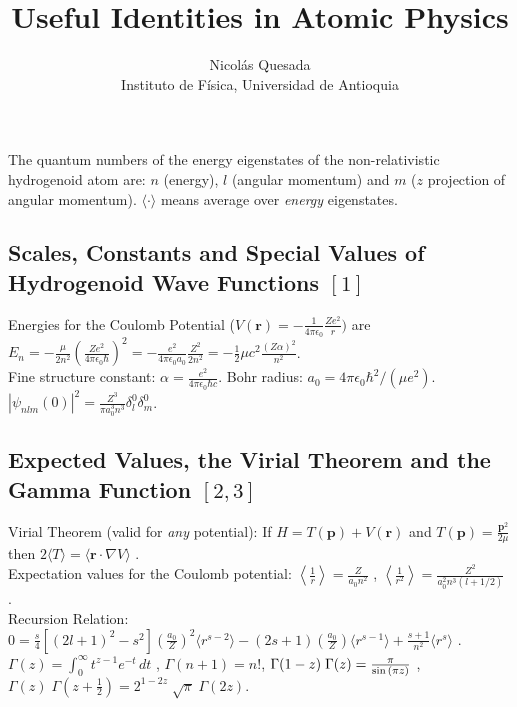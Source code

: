 \documentclass[english,11pt]{shreyasnotes}
\title{Useful Identities in Atomic Physics}
\author{Nicol\'as Quesada\\{\small \sf Instituto de F\'isica, Universidad de Antioquia}}
\date{}
\begin{document}
\maketitle
\thispagestyle{empty}
\noindent The quantum numbers of the energy eigenstates of the non-relativistic hydrogenoid atom are: $n$ (energy), $l$ (angular momentum) and $m$ ($z$ projection of angular momentum). $\langle \cdot \rangle$ means average over \emph{energy} eigenstates.

\subsection*{Scales, Constants and Special Values of Hydrogenoid Wave Functions $[1]$}

Energies for the Coulomb Potential ($V(\textbf{r})=-\frac{1}{4 \pi \epsilon_0}\frac{Z e^2}{r})$ are $E_n=-\frac{\mu}{2n^2}\left( \frac{Ze^2}{4 \pi \epsilon_0 \hbar} \right)^2=-\frac{e^2}{4 \pi \epsilon_0 a_0} \frac{Z^2}{2 n^2}=-\frac{1}{2} \mu c^2 \frac{(Z \alpha)^2}{n ^2}$.\\

\noindent Fine structure constant: $\alpha=\frac{e^2}{4 \pi \epsilon_0 \hbar c}$. Bohr radius: $a_0=4 \pi \epsilon_0 \hbar^2/(\mu e^2)$. \space \space \space
$|\psi_{n l m}(0)|^2=\frac{Z^3}{\pi a_0^3 n^3} \delta_{l}^0 \delta_m^0$.

\subsection*{Expected Values, the Virial Theorem and the Gamma Function $[2,3]$}

Virial Theorem (valid for \emph{any} potential): If $H=T(\textbf{p})+V(\textbf{r})$ and $T(\textbf{p})=\frac{\textbf{p}^2}{2\mu}$ then $2\langle T \rangle=\langle \textbf{r} \cdot \nabla V \rangle$ .\\

\noindent Expectation values for the Coulomb potential: $\left\langle \frac{1}{r} \right\rangle=\frac{Z}{a_0 n^2}$ , $\left\langle \frac{1}{r^2} \right\rangle=\frac{Z^2}{a_0^2 n^3 (l+1/2)}$ .\\

\noindent Recursion Relation: $0=\frac{s}{4}\left[(2 l+1)^2-s^2 \right] \left( \frac{a_0}{Z} \right)^2 \langle r^{s-2} \rangle-(2s+1)\left(\frac{a_0}{Z} \right) \langle r^{s-1} \rangle+\frac{s+1}{n^2} \langle r^s \rangle$ .\\

\noindent $\Gamma(z) = \int_0^\infty  t^{z-1} e^{-t}\,dt $ \space , \space $\Gamma(n+1)=n!$\space , \space $ \Gamma(1-z) \; \Gamma(z) = {\pi \over \sin{(\pi z)}} \,\! $ \space , \space  $\Gamma(z) \; \Gamma\left(z + \frac{1}{2}\right) = 2^{1-2z} \; \sqrt{\pi} \; \Gamma(2z). \,\! $
\end{document}
